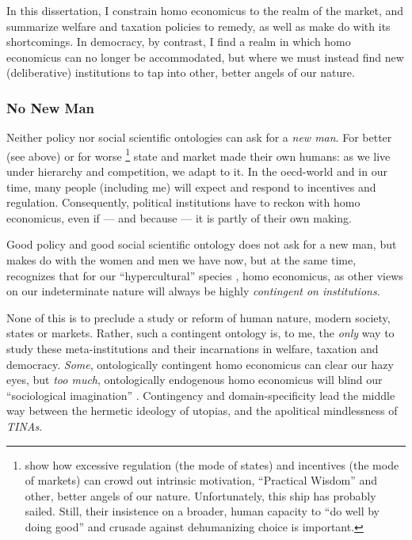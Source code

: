 {In this dissertation, I constrain homo economicus to the realm of the market, and summarize welfare and taxation policies to remedy, as well as make do with its shortcomings.
In democracy, by contrast, I find a realm in which homo economicus can no longer be accommodated, but where we must instead find new (deliberative) institutions to tap into other, better angels of our nature.

\subsubsection{No New Man}
Neither policy nor social scientific ontologies can ask for a \emph{new man}.
For better (see above) or for worse \citep[for example,][]{Schwartz2010}
\footnote{
	\cite{Schwartz2010} show how excessive regulation (the mode of states) and incentives (the mode of markets) can crowd out intrinsic motivation, ``Practical Wisdom'' and other, better angels of our nature.
	Unfortunately, this ship has probably sailed.
	Still, their insistence on a broader, human capacity to ``do well by doing good'' and crusade against dehumanizing choice is important.
}
state and market made their own humans:
as we live under hierarchy and competition, we adapt to it.
In the \gls{oecd}-world and in our time, many people (including me) will expect and respond to incentives and regulation.
Consequently, political institutions have to reckon with homo economicus, even if --- and because --- it is partly of their own making.

Good policy and good social scientific ontology does not ask for a new man, but makes do with the women and men we have now, but at the same time, recognizes that for our ``hypercultural'' species \citep{Henrich2004}, homo economicus, as other views on our indeterminate nature will always be highly \emph{contingent on institutions}.

None of this is to preclude a study or reform of human nature, modern society, states or markets.
Rather, such a contingent ontology is, to me, the \emph{only} way to study these meta-institutions and their incarnations in welfare, taxation and democracy.
\emph{Some}, ontologically contingent homo economicus can clear our hazy eyes, but \emph{too much}, ontologically endogenous homo economicus will blind our ``sociological imagination'' \citep{Mills-1959-aa}.
Contingency and domain-specificity lead the middle way between the hermetic ideology of utopias, and the apolitical mindlessness of \emph{TINAs}.

}
